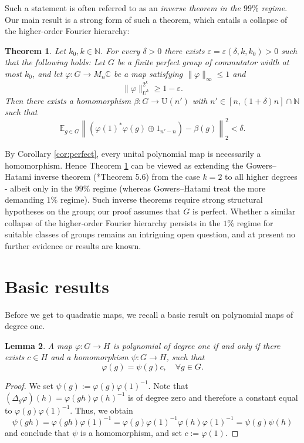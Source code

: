 \documentclass[a4paper,11pt]{amsproc}
\theoremstyle{plain}
\newtheorem{theorem}{Theorem}[section]
\newtheorem{lemma}[theorem]{Lemma}
\theoremstyle{definition}
\begin{document}
Such a statement is often referred to as an \emph{inverse theorem in the $99\%$ regime}. Our main result is a strong form of such a theorem, which entails a collapse of the higher-order Fourier hierarchy: 

\begin{theorem} \label{thm:gowers}
Let $k_0, k \in \mathbb{N}$. For every $\delta > 0$ there exists $\varepsilon = \varepsilon(\delta, k, k_0) > 0$ such that the following holds:  
Let $G$ be a finite perfect group of commutator width at most $k_0$, and let $\varphi \colon G \to M_n \mathbb{C}$ be a map satisfying $\|\varphi\|_{\infty} \leq 1$ and
\[
\|\varphi\|^{2^k}_{U^k} \geq 1 - \varepsilon.
\]
Then there exists a homomorphism $\beta \colon G \to \mathrm{U}(n')$ with $n' \in [n, (1+\delta)n] \cap \mathbb{N}$ such that
\[
\mathbb{E}_{g \in G} \left\| (\varphi(1)^* \varphi(g) \oplus 1_{n'-n}) - \beta(g) \right\|_2^2 < \delta.
\]
\end{theorem}

By Corollary \ref{cor:perfect}, every unital polynomial map is necessarily a homomorphism.  Hence Theorem \ref{thm:gowers} can be viewed as extending the Gowers--Hatami inverse theorem (\cite{MR3733361}*{Theorem 5.6}) from the case $k=2$ to all higher degrees - albeit only in the $99\%$ regime (whereas Gowers--Hatami treat the more demanding $1\%$ regime). 
Such inverse theorems require strong structural hypotheses on the group; our proof assumes that $G$ is perfect.  Whether a similar collapse of the higher‐order Fourier hierarchy persists in the $1\%$ regime for suitable classes of groups remains an intriguing open question, and at present no further evidence or results are known.



\section{Basic results}

Before we get to quadratic maps, we recall a basic result on polynomial maps of degree one.

\begin{lemma} \label{lem:affine}
A map $\varphi \colon G \to H$ is polynomial of degree one if and only if there exists $c \in H$ and a homomorphism $\psi \colon G \to H$, such that
$$\varphi(g) = \psi(g)c, \quad \forall g \in G.$$
\end{lemma}
\begin{proof}
We set $\psi(g):=\varphi(g)\varphi(1)^{-1}$. 
Note that $(\Delta_g \varphi)(h) = \varphi(gh)\varphi(h)^{-1}$ is of degree zero and therefore a constant equal to $\varphi(g)\varphi(1)^{-1}$. Thus, we obtain
$$\psi(gh) = \varphi(gh) \varphi(1)^{-1} = \varphi(g) \varphi(1)^{-1} \varphi(h) \varphi(1)^{-1} = \psi(g) \psi(h)$$
and conclude that $\psi$ is a homomorphism, and set $c:=\varphi(1)$. 
\end{proof}
\end{document}
